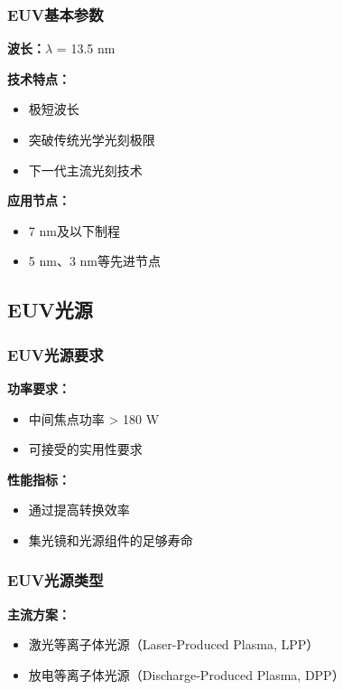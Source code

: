 \documentclass[UTF8,12pt,a4paper]{ctexart}
\begin{document}
\subsubsection{EUV基本参数}

\textbf{波长：}$\lambda$ = 13.5 nm

\textbf{技术特点：}
\begin{itemize}
    \item 极短波长
    \item 突破传统光学光刻极限
    \item 下一代主流光刻技术
\end{itemize}

\textbf{应用节点：}
\begin{itemize}
    \item 7 nm及以下制程
    \item 5 nm、3 nm等先进节点
\end{itemize}

\subsection{EUV光源}

\subsubsection{EUV光源要求}

\textbf{功率要求：}
\begin{itemize}
    \item 中间焦点功率 > 180 W
    \item 可接受的实用性要求
\end{itemize}

\textbf{性能指标：}
\begin{itemize}
    \item 通过提高转换效率
    \item 集光镜和光源组件的足够寿命
\end{itemize}

\subsubsection{EUV光源类型}

\textbf{主流方案：}
\begin{itemize}
    \item 激光等离子体光源（Laser-Produced Plasma, LPP）
    \item 放电等离子体光源（Discharge-Produced Plasma, DPP）
\end{itemize}
\end{document}
